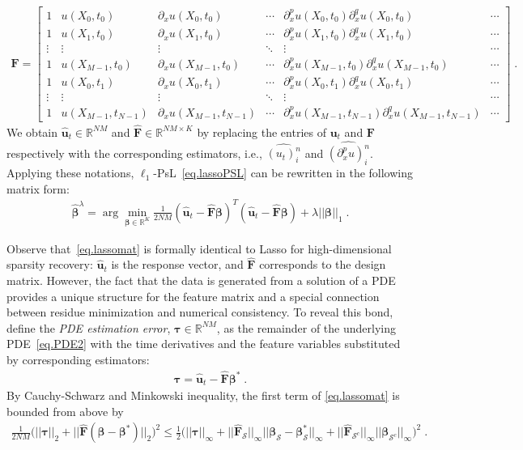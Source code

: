 \documentclass[a4paper,11pt]{article}
\newcommand{\btau}{\bm{\tau}}
\newcommand{\bbeta}{\bm{\beta}}
\newcommand{\bF}{\mathbf{F}}
\newcommand{\mS}{\mathcal{S}}
\newcommand{\bu}{\mathbf{u}}
\begin{document}
\begin{align}
\mathbf{F} =\begin{bmatrix}
 	1&u(X_0,t_0) & \partial_xu(X_0,t_0)  &\cdots& \partial^p_xu(X_0,t_0)\partial_x^qu(X_0,t_0) &\cdots\\
 	1&u(X_1,t_0) & \partial_xu(X_1,t_0)  &\cdots& \partial^p_xu(X_1,t_0)\partial_x^qu(X_1,t_0) &\cdots\\
 	\vdots&\vdots& \vdots&\ddots&\vdots&\cdots\\
 	1&u(X_{M-1},t_0) & \partial_xu(X_{M-1},t_0)  &\cdots& \partial^p_xu(X_{M-1},t_0)\partial_x^qu(X_{M-1},t_0) &\cdots\\
 	1&u(X_{0},t_1) & \partial_xu(X_{0},t_1)  &\cdots& \partial^p_xu(X_{0},t_1)\partial_x^qu(X_{0},t_1) &\cdots\\
 	\vdots&\vdots& \vdots&\ddots&\vdots&\cdots\\
 	1&u(X_{M-1},t_{N-1})&\partial_xu(X_{M-1},t_{N-1})&\cdots& \partial^p_xu(X_{M-1},t_{N-1})\partial_x^qu(X_{M-1},t_{N-1})  &\cdots
 	\end{bmatrix}\;.\label{def.featuremat}
\end{align}
We obtain $\widehat{\mathbf{u}}_t\in\mathbb{R}^{NM}$ and $\widehat{\mathbf{F}}\in\mathbb{R}^{NM\times K}$  by replacing the entries of $\mathbf{u}_t$ and $\mathbf{F}$ respectively with the corresponding estimators, i.e., $\widehat{(u_t)_i^n}$ and $\widehat{(\partial_x^pu)_i^n}$. Applying these notations, $\ell_1$-PsL~\eqref{eq.lassoPSL} can be rewritten in the following matrix form:
\begin{align}
\widehat{\bbeta}^\lambda=\arg\min_{\bbeta\in\mathbb{R}^K}\frac{1}{2NM}(\widehat{\bu}_t-\widehat{\bF}\bbeta)^T(\widehat{\bu}_t-\widehat{\bF}\bbeta)+\lambda||\bbeta||_1\;.\label{eq.lassomat}
\end{align}

Observe that~\eqref{eq.lassomat} is formally identical to Lasso for high-dimensional sparsity recovery: $\widehat{\bu}_t$ is the response vector, and $\widehat{\bF}$ corresponds to the design matrix. However, the fact that the data is generated from a solution of a PDE provides a unique structure for the feature matrix and a special connection between residue minimization and numerical consistency. To reveal this bond, define the \textit{PDE estimation error}, $\btau\in\mathbb{R}^{NM}$, as the remainder of the underlying PDE~\eqref{eq.PDE2} with the time derivatives and the feature variables substituted by corresponding estimators:
\begin{align}
\btau=\widehat{\bu}_t-\widehat{\bF}\bbeta^*\;.\label{eq.tau}
\end{align}
By Cauchy-Schwarz and Minkowski inequality, the first term of \eqref{eq.lassomat} is bounded from above by
\begin{align}
\frac{1}{2NM}\big(||\btau||_2+||\widehat{\bF}(\bbeta-\bbeta^*)||_2\big)^2\leq \frac{1}{2}\big(||\btau||_\infty+||\widehat{\bF}_\mS||_\infty||\bbeta_\mS-\bbeta_\mS^*||_\infty+||\widehat{\bF}_{\mS^c}||_\infty||\bbeta_{\mS^c}||_\infty\big)^2\;.\label{eq.lassomat_tau}	
\end{align}
\end{document}

